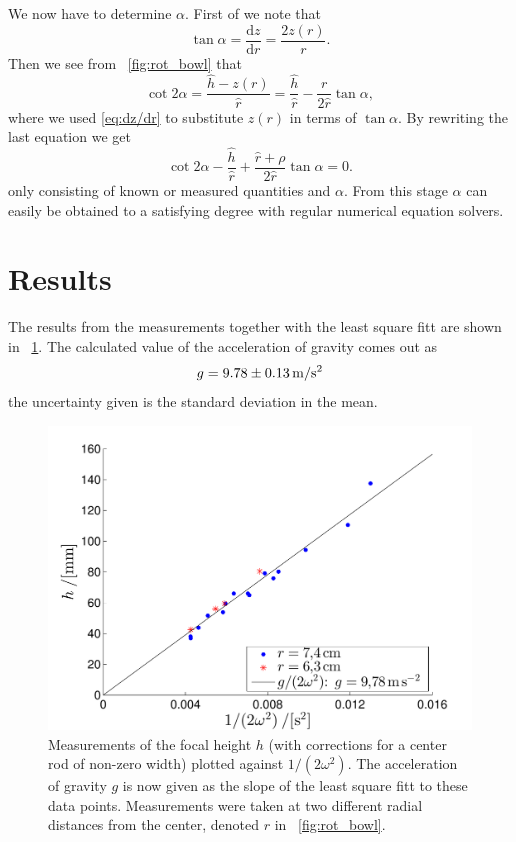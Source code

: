 \documentclass[11pt,towcolumn, swedish, english]{article}
\newcommand{\rd}{\ensuremath{\mathrm{d}}}
\newcommand{\figref}{\figurename~\ref}
\begin{document}
We now have to determine $\alpha$. First of we note that
\begin{equation}\label{eq:dz/dr}
\tan\alpha=\frac{\rd z}{\rd r}=\frac{2 z(r)}{r}.
\end{equation}
Then we see from \figref{fig:rot_bowl} that 
\begin{equation*}
\cot 2\alpha =\frac{\hat{h} - z(r)}{\hat{r}} 
= \frac{\hat{h}}{\hat{r}}-\frac{r}{2\hat{r}}\tan\alpha,
\end{equation*}
where we used \eqref{eq:dz/dr} to substitute $z(r)$ in terms of
$\tan\alpha$. By rewriting the last equation we get
\begin{equation*}
\cot 2\alpha 
-\frac{\hat{h}}{\hat{r}}
+\frac{\hat{r}+\rho}{2\hat{r}}\tan\alpha  = 0.
\end{equation*}
only consisting of known or measured quantities and $\alpha$. From
this stage $\alpha$ can easily be obtained to a satisfying degree with
regular numerical equation solvers.

\section{Results}
The results from the measurements together with the least square fitt
are shown in \figref{fig:data}. The calculated value of the
acceleration of gravity comes out as
\begin{equation*}
g=\unit[9.78\pm 0.13]{m/s^2}
\end{equation*}
the uncertainty given is the standard deviation in the mean.


\begin{figure}\centering 
\includegraphics[width=.6\linewidth]{g_minsta_kvadrat.pdf}
\caption{\label{fig:data} Measurements of the focal height $h$ (with
  corrections for a center rod of non-zero width) plotted against
  $1/(2\omega^2)$. The acceleration of gravity $g$ is now given as the
  slope of the least square fitt to these data points. Measurements
  were taken at two different radial distances from the center,
  denoted $r$ in \figref{fig:rot_bowl}.
}
\end{figure}
\end{document}
